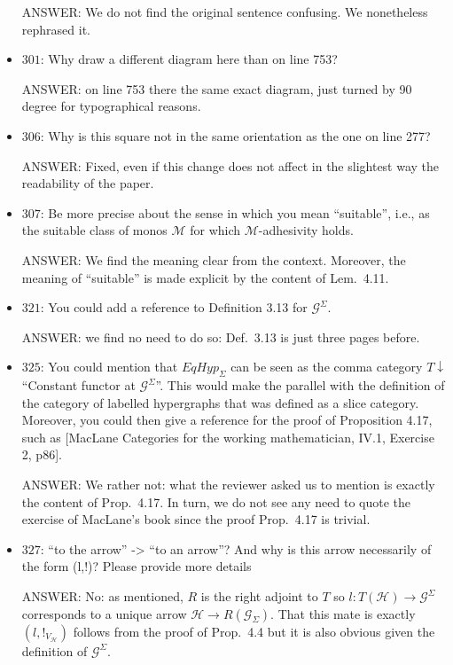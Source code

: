 \documentclass[english,11pt,a4paper]{article}
\begin{document}
\begin{itemize}
ANSWER: We do not find the original sentence confusing. We nonetheless rephrased it.

\item $301$: Why draw a different diagram here than on line 753?

ANSWER: on line 753 there the same exact diagram, just turned by 90 degree for typographical reasons. 

\item $306$: Why is this square not in the same orientation as the one on line 277?

ANSWER: Fixed, even if this change does not affect in the slightest way the readability of the paper. 

\item $307$: Be more precise about the sense in which you mean ``suitable'', i.e., as the suitable class of monos $\mathcal{M}$ for which $\mathcal{M}$-adhesivity holds.

ANSWER: We find the meaning  clear from the context. Moreover, the meaning of ``suitable'' is made explicit by the content of Lem.~4.11.

\item $321$: You could add a reference to Definition 3.13 for $\mathcal{G}^\Sigma$.

ANSWER: we find no need to do so: Def.~3.13 is just three pages before.

\item $325$: You could mention that $EqHyp_\Sigma$ can be seen as the comma category $T \downarrow$ ``Constant functor at $\mathcal{G}^\Sigma$''. This would make the parallel with the definition of the category of labelled hypergraphs that was defined as a slice category. Moreover, you could then give a reference for the proof of Proposition 4.17, such as [MacLane Categories for the working mathematician, IV.1, Exercise 2, p86].

ANSWER: We rather not: what the reviewer asked us to mention is exactly the content of Prop.~4.17. In turn, we do not see any need to quote the exercise of MacLane's book since the proof Prop.~4.17 is trivial.

\item $327$: ``to the arrow'' -> ``to an arrow''? And why is this arrow necessarily of the form (l,!)? Please provide more details

ANSWER:  No: as mentioned, $R$  is the right adjoint to $T$ so $l\colon T(\mathcal{H})\to \mathcal{G}^\Sigma$ corresponds to a unique arrow $\mathcal{H}\to R(\mathcal{G}_\Sigma)$. That this mate is exactly $(l, !_{V_{\mathcal{H}}})$ follows from the proof of Prop.~4.4 but it is also obvious given the definition of $\mathcal{G}^\Sigma$.



\end{itemize}
\end{document}
